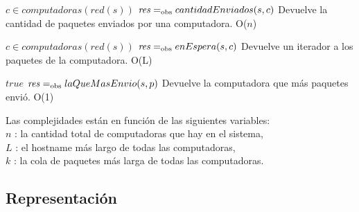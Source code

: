  {$c \in computadoras(red(s))$}
 {$\text{\textit{res}} =_{\mathrm{obs}} cantidadEnviados(s,c)$}
 {Devuelve la cantidad de paquetes enviados por una computadora.}
 {O($n$)} %

 {$c \in computadoras(red(s))$}
 {$\text{\textit{res}} =_{\mathrm{obs}} enEspera(s,c)$}
 {Devuelve un iterador a los paquetes de la computadora.}
 {O(L)}

 {$true$}
 {$\text{\textit{res}} =_{\mathrm{obs}} laQueMasEnvio(s,p)$}
 {Devuelve la computadora que más paquetes envió.}
 {O(1)}

Las complejidades están en función de las siguientes variables:\\
$n$ : la cantidad total de computadoras que hay en el sistema, \\
$L$ : el hostname más largo de todas las computadoras, \\
$k$ : la cola de paquetes más larga de todas las computadoras. 

\subsection{Representación}




